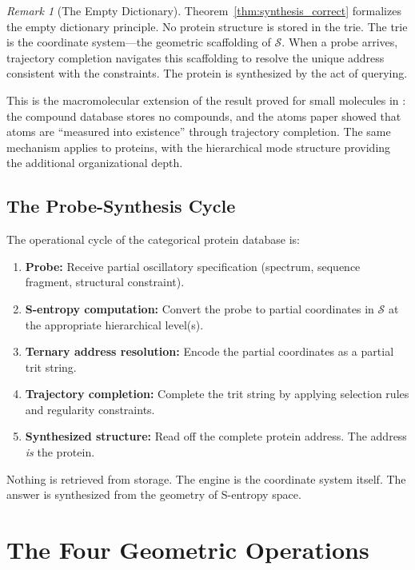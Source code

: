 \documentclass[11pt,twocolumn,a4paper]{article}
\theoremstyle{definition}
\theoremstyle{remark}
\newtheorem{remark}[theorem]{Remark}
\newcommand{\Sspace}{\mathcal{S}}
\begin{document}
\begin{remark}[The Empty Dictionary]
Theorem~\ref{thm:synthesis_correct} formalizes the empty dictionary principle. No protein structure is stored in the trie. The trie is the coordinate system---the geometric scaffolding of $\Sspace$. When a probe arrives, trajectory completion navigates this scaffolding to resolve the unique address consistent with the constraints. The protein is synthesized by the act of querying.

This is the macromolecular extension of the result proved for small molecules in \citet{sachikonye2025a}: the compound database stores no compounds, and the atoms paper \citep{sachikonye2025b} showed that atoms are ``measured into existence'' through trajectory completion. The same mechanism applies to proteins, with the hierarchical mode structure providing the additional organizational depth.
\end{remark}

\subsection{The Probe-Synthesis Cycle}

The operational cycle of the categorical protein database is:
\begin{enumerate}[nosep]
\item \textbf{Probe:} Receive partial oscillatory specification (spectrum, sequence fragment, structural constraint).
\item \textbf{S-entropy computation:} Convert the probe to partial coordinates in $\Sspace$ at the appropriate hierarchical level(s).
\item \textbf{Ternary address resolution:} Encode the partial coordinates as a partial trit string.
\item \textbf{Trajectory completion:} Complete the trit string by applying selection rules and regularity constraints.
\item \textbf{Synthesized structure:} Read off the complete protein address. The address \emph{is} the protein.
\end{enumerate}

Nothing is retrieved from storage. The engine is the coordinate system itself. The answer is synthesized from the geometry of S-entropy space.

\section{The Four Geometric Operations}
\label{sec:four_operations}
\end{document}
